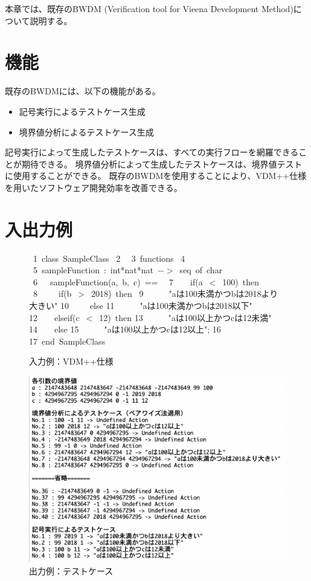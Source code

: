 \documentclass[uplatex, report, a4j, 10pt]{jsbook}
\newcommand{\tool}{BWDM}
\newcommand{\toolFullName}{Verification tool for Vieena Development Method}
\begin{document}
本章では、既存の\tool{} (\toolFullName{})について説明する。

\section{機能}
既存のBWDMには、以下の機能がある。

\begin{itemize}
  \item 記号実行によるテストケース生成
  \item 境界値分析によるテストケース生成
\end{itemize}

記号実行によって生成したテストケースは、すべての実行フローを網羅できることが期待できる。
境界値分析によって生成したテストケースは、境界値テストに使用することができる。
既存のBWDMを使用することにより、VDM++仕様を用いたソフトウェア開発効率を改善できる。

\section{入出力例}

\begin{figure}[tb]
  \vbox{
    \hbox{ 1 class SampleClass}
    \hbox{ 2 }
    \hbox{ 3 functions}
    \hbox{ 4 }
    \hbox{ 5 sampleFunction : int*nat*nat $->$ seq of char}
    \hbox{ 6 \ \ sampleFunction(a, b, c) == }
    \hbox{ 7 \ \ \ if(a $<$ 100) then}
    \hbox{ 8 \ \ \ \ if(b $>$ 2018) then}
    \hbox{ 9 \ \ \ \ \ "aは100未満かつbは2018より大きい"}
    \hbox{10 \ \ \ \ else}
    \hbox{11 \ \ \ \ \ "aは100未満かつbは2018以下"}
    \hbox{12 \ \ \ elseif(c $<$ 12) then}
    \hbox{13 \ \ \ \ \ "aは100以上かつcは12未満"}
    \hbox{14 \ \ \ else}
    \hbox{15 \ \ \ \ \ "aは100以上かつcは12以上";}
    \hbox{16 }
    \hbox{17 end SampleClass}
  }
  \centerline{}
  \caption{入力例：VDM++仕様}
  \label{fig:input_sample}
\end{figure}

\begin{figure}[t]
  \begin{center}
    \includegraphics[keepaspectratio, width=160mm]{figs/sample_testcase.png}
    \caption{出力例：テストケース}
    \label{fig:testcase_sample}
  \end{center}
\end{figure}
\end{document}
